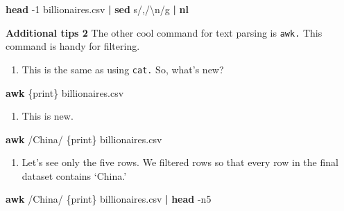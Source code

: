 \documentclass[
]{book}
\newenvironment{Shaded}{\begin{snugshade}}{\end{snugshade}}
\newcommand{\AttributeTok}[1]{\textcolor[rgb]{0.13,0.29,0.53}{#1}}
\newcommand{\FunctionTok}[1]{\textcolor[rgb]{0.13,0.29,0.53}{\textbf{#1}}}
\newcommand{\KeywordTok}[1]{\textcolor[rgb]{0.13,0.29,0.53}{\textbf{#1}}}
\newcommand{\NormalTok}[1]{#1}
\newcommand{\StringTok}[1]{\textcolor[rgb]{0.31,0.60,0.02}{#1}}
\providecommand{\tightlist}{%
  \setlength{\itemsep}{0pt}\setlength{\parskip}{0pt}}
\begin{document}
\begin{Shaded}
\begin{Highlighting}[]
\FunctionTok{head} \AttributeTok{{-}1}\NormalTok{ billionaires.csv }\KeywordTok{|} \FunctionTok{sed} \StringTok{\textquotesingle{}s/,/\textbackslash{}n/g\textquotesingle{}} \KeywordTok{|} \FunctionTok{nl}
\end{Highlighting}
\end{Shaded}

\textbf{Additional tips 2}
The other cool command for text parsing is \texttt{awk.} This command is handy for filtering.

\begin{enumerate}
\def\labelenumi{\arabic{enumi}.}
\tightlist
\item
  This is the same as using \texttt{cat.} So, what's new?
\end{enumerate}

\begin{Shaded}
\begin{Highlighting}[]
\FunctionTok{awk} \StringTok{\textquotesingle{}\{print\}\textquotesingle{}}\NormalTok{ billionaires.csv}
\end{Highlighting}
\end{Shaded}

\begin{enumerate}
\def\labelenumi{\arabic{enumi}.}
\setcounter{enumi}{1}
\tightlist
\item
  This is new.
\end{enumerate}

\begin{Shaded}
\begin{Highlighting}[]
\FunctionTok{awk} \StringTok{\textquotesingle{}/China/ \{print\}\textquotesingle{}}\NormalTok{ billionaires.csv}
\end{Highlighting}
\end{Shaded}

\begin{enumerate}
\def\labelenumi{\arabic{enumi}.}
\setcounter{enumi}{2}
\tightlist
\item
  Let's see only the five rows. We filtered rows so that every row in the final dataset contains `China.'
\end{enumerate}

\begin{Shaded}
\begin{Highlighting}[]
\FunctionTok{awk} \StringTok{\textquotesingle{}/China/ \{print\}\textquotesingle{}}\NormalTok{ billionaires.csv }\KeywordTok{|} \FunctionTok{head} \AttributeTok{{-}n5}
\end{Highlighting}
\end{Shaded}
\end{document}
